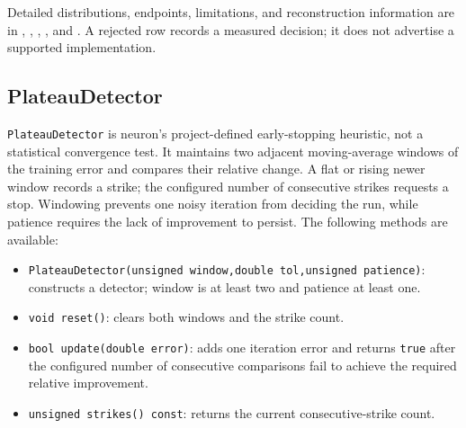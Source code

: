 Detailed distributions, endpoints, limitations, and reconstruction information
are in ,
,
,
, and
.  A rejected row records a
measured decision; it does not advertise a supported implementation.

\subsection{PlateauDetector}
\texttt{PlateauDetector} is neuron's project-defined early-stopping heuristic,
not a statistical convergence test.  It maintains two adjacent moving-average
windows of the training error and compares their relative change.  A flat or
rising newer window records a strike; the configured number of consecutive
strikes requests a stop.  Windowing prevents one noisy iteration from deciding
the run, while patience requires the lack of improvement to persist.  The
following methods are available:

\begin{itemize}
\item \texttt{PlateauDetector(unsigned window,double tol,unsigned patience)}:
      constructs a detector; window is at least two and patience at least one.
\item \texttt{void reset()}: clears both windows and the strike count.
\item \texttt{bool update(double error)}: adds one iteration error and returns
      \texttt{true} after the configured number of consecutive comparisons fail
      to achieve the required relative improvement.
\item \texttt{unsigned strikes() const}: returns the current consecutive-strike
      count.
\end{itemize}

